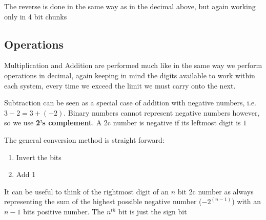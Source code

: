 \documentclass[english,course]{Notes}
\begin{document}
{		      \par{The reverse is done in the same way as in the decimal above, but again working only in 4 bit chunks}
	     
	     \subsection{Operations}

	\par{Multiplication and Addition are performed much like in the same way we perform operations in decimal, again keeping in mind the digits available to work within each system, every time we exceed the limit we must carry onto the next.}
	
	\par{Subtraction can be seen as a special case of addition with negative numbers, i.e. $3 - 2 = 3 + (-2)$. Binary numbers cannot represent negative numbers however, so we use \textbf{2's complement}. A 2c number is negative if its leftmost digit is $1$}
	
	\newpage
	
	\par{The general conversion method is straight forward:}
	\begin{enumerate}
		\item Invert the bits
		\item Add 1
	\end{enumerate}
	
	\par{It can be useful to think of the rightmost digit of an $n$ bit 2c number as always representing the sum of  the highest possible negative number ($-2^{(n-1)}$) with an $n-1$ bits positive number. The $n^{th}$ bit is just the sign bit }
	
	
}
\end{document}
